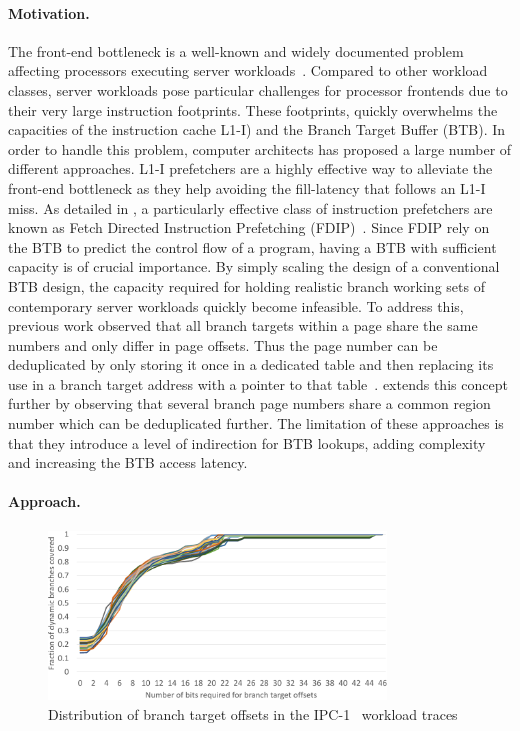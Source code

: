\documentclass[../main.tex]{subfiles}
\begin{document}
\begin{refsection}
\paragraph{Motivation.}
The front-end bottleneck is a well-known and widely documented problem
affecting processors executing server
workloads~\cite{ailamaki99_dbmss_moder_proces,ferdman12_clear_cloud,kanev15_profil,ayers19_asmdb}. Compared
to other workload classes, server workloads pose particular challenges
for processor frontends due to their very large instruction
footprints. These footprints, quickly overwhelms the capacities of the
instruction cache L1-I) and the Branch Target Buffer (BTB). In order
to handle this problem, computer architects has proposed a large
number of different approaches. L1-I prefetchers are a highly
effective way to alleviate the front-end bottleneck as they help
avoiding the fill-latency that follows an L1-I miss.  As detailed in
, a particularly
effective class of instruction prefetchers are known as Fetch Directed
Instruction Prefetching
(FDIP)~\cite{reinman99_fetch_direc_instr_prefet}. Since FDIP rely on
the BTB to predict the control flow of a program, having a BTB with
sufficient capacity is of crucial importance. By simply scaling the
design of a conventional BTB design, the capacity required for holding
realistic branch working sets of contemporary server workloads quickly
become infeasible. To address this, previous work observed that all
branch targets within a page share the same numbers and only differ in
page offsets. Thus the page number can be deduplicated by only storing
it once in a dedicated table and then replacing its use in a branch
target address with a pointer to that
table~\cite{seznec96_dont_use_page_number_point_it}. \textcite{soundararajan21_pdede}
extends this concept further by observing that several branch page
numbers share a common region number which can be deduplicated
further. The limitation of these approaches is that they introduce a
level of indirection for BTB lookups, adding complexity and increasing
the BTB access latency.


\paragraph{Approach.}

\begin{figure}[ht]
  \centering
  \includegraphics[width=0.8\textwidth]{figures/offset_distribution.pdf}
  \caption{\label{fig:offset-distr} Distribution of branch target offsets in the IPC-1~\cite{ipc1} workload traces}
\end{figure}


\end{refsection}
\end{document}
